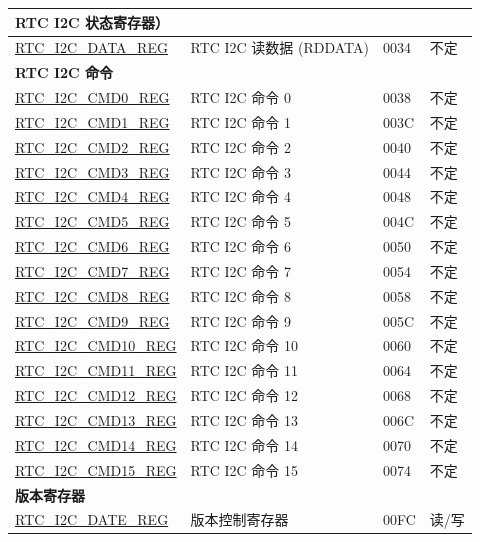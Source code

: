 \begin{longtable}{ | p{6cm} | p{7.2cm} | p{1.3cm} | p{1cm} | }
\multicolumn{4}{|l|}{\textbf{RTC I2C 状态寄存器）}} \\ \hline
\hyperref[regdesc:RTCI2CDATAREG]{RTC\_I2C\_DATA\_REG} & RTC I2C 读数据 (RDDATA) & \hexprefix{}0034 & 不定 \\ \hline
\multicolumn{4}{|l|}{\textbf{ RTC I2C 命令}} \\ \hline
\hyperref[regdesc:RTCI2CCMD0REG]{RTC\_I2C\_CMD0\_REG} & RTC I2C 命令 0 & \hexprefix{}0038 & 不定 \\ \hline
\hyperref[regdesc:RTCI2CCMD1REG]{RTC\_I2C\_CMD1\_REG} & RTC I2C 命令 1 & \hexprefix{}003C & 不定 \\ \hline
\hyperref[regdesc:RTCI2CCMD2REG]{RTC\_I2C\_CMD2\_REG} & RTC I2C 命令 2 & \hexprefix{}0040 & 不定 \\ \hline
\hyperref[regdesc:RTCI2CCMD3REG]{RTC\_I2C\_CMD3\_REG} & RTC I2C 命令 3 & \hexprefix{}0044 & 不定 \\ \hline
\hyperref[regdesc:RTCI2CCMD4REG]{RTC\_I2C\_CMD4\_REG} & RTC I2C 命令 4 & \hexprefix{}0048 & 不定 \\ \hline
\hyperref[regdesc:RTCI2CCMD5REG]{RTC\_I2C\_CMD5\_REG} & RTC I2C 命令 5 & \hexprefix{}004C & 不定 \\ \hline
\hyperref[regdesc:RTCI2CCMD6REG]{RTC\_I2C\_CMD6\_REG} & RTC I2C 命令 6 & \hexprefix{}0050 & 不定 \\ \hline
\hyperref[regdesc:RTCI2CCMD7REG]{RTC\_I2C\_CMD7\_REG} & RTC I2C 命令 7 & \hexprefix{}0054 & 不定 \\ \hline
\hyperref[regdesc:RTCI2CCMD8REG]{RTC\_I2C\_CMD8\_REG} & RTC I2C 命令 8 & \hexprefix{}0058 & 不定 \\ \hline
\hyperref[regdesc:RTCI2CCMD9REG]{RTC\_I2C\_CMD9\_REG} & RTC I2C 命令 9 & \hexprefix{}005C & 不定 \\ \hline
\hyperref[regdesc:RTCI2CCMD10REG]{RTC\_I2C\_CMD10\_REG} & RTC I2C 命令 10 & \hexprefix{}0060 & 不定 \\ \hline
\hyperref[regdesc:RTCI2CCMD11REG]{RTC\_I2C\_CMD11\_REG} & RTC I2C 命令 11 & \hexprefix{}0064 & 不定 \\ \hline
\hyperref[regdesc:RTCI2CCMD12REG]{RTC\_I2C\_CMD12\_REG} & RTC I2C 命令 12 & \hexprefix{}0068 & 不定 \\ \hline
\hyperref[regdesc:RTCI2CCMD13REG]{RTC\_I2C\_CMD13\_REG} & RTC I2C 命令 13 & \hexprefix{}006C & 不定 \\ \hline
\hyperref[regdesc:RTCI2CCMD14REG]{RTC\_I2C\_CMD14\_REG} & RTC I2C 命令 14 & \hexprefix{}0070 & 不定 \\ \hline
\hyperref[regdesc:RTCI2CCMD15REG]{RTC\_I2C\_CMD15\_REG} & RTC I2C 命令 15 & \hexprefix{}0074 & 不定 \\ \hline
\multicolumn{4}{|l|}{\textbf{版本寄存器}} \\ \hline
\hyperref[regdesc:RTCI2CDATEREG]{RTC\_I2C\_DATE\_REG} & 版本控制寄存器 & \hexprefix{}00FC & 读/写 \\ \hline
\end{longtable}

